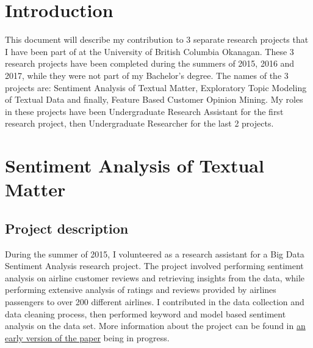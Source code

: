 \documentclass[12pt]{article} %
\begin{document}
\tableofcontents %

\newpage %


\section{Introduction} %
This document will describe my contribution to 3 separate research projects that I have been part of at the University of British Columbia Okanagan. These 3 research projects have been completed during the summers of 2015, 2016 and 2017, while they were not part of my Bachelor’s degree. The names of the 3 projects are: Sentiment Analysis of Textual Matter, Exploratory Topic Modeling of Textual Data and finally, Feature Based Customer Opinion Mining. My roles in these projects have been Undergraduate Research Assistant for the first research project, then Undergraduate Researcher for the last 2 projects.

\section{Sentiment Analysis of Textual Matter} %

\subsection{Project description} %
During the summer of 2015, I volunteered as a research assistant for a Big Data Sentiment Analysis research project. The project involved performing sentiment analysis on airline customer reviews and retrieving insights from the data, while performing extensive analysis of ratings and reviews provided by airlines passengers to over 200 different airlines. I contributed in the data collection and data cleaning process, then performed keyword and model based sentiment analysis on the data set. More information about the project can be found in \href{https://github.com/norberte/DataCollector/blob/master/docs/AirlinesPaper.pdf}{an early version of the paper} being in progress.
\end{document}
